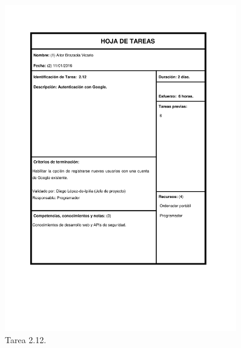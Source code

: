 \documentclass{DeustoFDP}
\begin{document}
\begin{figure}[H]
	\centering
	\includegraphics[width=0.9\textwidth]{fig/Tareas/212}
	\caption{Tarea 2.12.}
	\label{fig:t212}
\end{figure}
\end{document}
